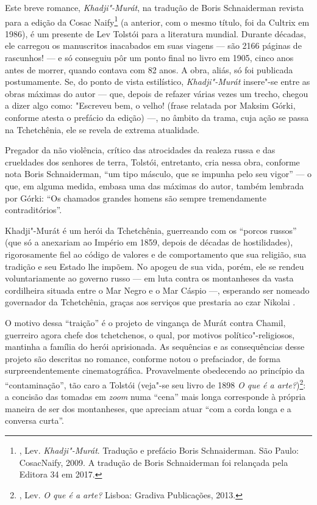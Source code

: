 Este breve romance, \emph{Khadji"-Murát}, na tradução de Boris
Schnaiderman revista para a edição da Cosac Naify\footnote{,
  Lev. \emph{Khadji"-Murát}. Tradução e prefácio Boris Schnaiderman. São
  Paulo: CosacNaify, 2009. A tradução de Boris Schnaiderman foi
  relançada pela Editora 34 em 2017.} (a anterior, com o mesmo título,
foi da Cultrix em 1986), é um presente de Lev Tolstói para a literatura
mundial. Durante décadas, ele carregou os manuscritos inacabados em suas
viagens --- são 2166 páginas de rascunhos! --- e só conseguiu pôr um
ponto final no livro em 1905, cinco anos antes de morrer, quando contava
com 82 anos. A obra, aliás, só foi publicada postumamente. Se, do ponto
de vista estilístico, \emph{Khadji"-Murát} insere"-se entre as
obras máximas do autor --- que, depois de refazer várias vezes um trecho,
chegou a dizer algo como: "Escreveu bem, o velho! (frase relatada por
Maksim Górki, conforme atesta o prefácio da edição) ---, no âmbito da
trama, cuja ação se passa na Tchetchênia, ele se revela de extrema
atualidade.

Pregador da não violência, crítico das atrocidades da realeza russa e
das crueldades dos senhores de terra, Tolstói, entretanto, cria nessa
obra, conforme nota Boris Schnaiderman, ``um tipo másculo, que se impunha
pelo seu vigor'' --- o que, em alguma medida, embasa uma das máximas do
autor, também lembrada por Górki: ``Os chamados grandes homens são sempre
tremendamente contraditórios''.

Khadji"-Murát é um herói da Tchetchênia, guerreando com os ``porcos
russos'' (que só a anexariam ao Império em 1859, depois de décadas de
hostilidades), rigorosamente fiel ao código de valores e de
comportamento que sua religião, sua tradição e seu Estado lhe impõem. No
apogeu de sua vida, porém, ele se rendeu voluntariamente ao governo
russo --- em luta contra os montanheses da vasta cordilheira situada
entre o Mar Negro e o Mar Cáspio ---, esperando ser nomeado governador da
Tchetchênia, graças aos serviços que prestaria ao czar Nikolai .

O motivo dessa ``traição'' é o projeto de vingança de Murát contra Chamil,
guerreiro agora chefe dos tchetchenos, o qual, por motivos
político"-religiosos, mantinha a família do herói aprisionada. As
sequências e as consequências desse projeto são descritas no romance,
conforme notou o prefaciador, de forma surpreendentemente
cinematográfica. Provavelmente obedecendo ao princípio da
``contaminação'', tão caro a Tolstói (veja"-se seu livro de 1898 \emph{O
que é a arte?})\footnote{, Lev. \emph{O que é a arte?} Lisboa:
  Gradiva Publicações, 2013.}: a concisão das tomadas em \emph{zoom}
numa ``cena'' mais longa corresponde à própria maneira de ser dos
montanheses, que apreciam atuar ``com a corda longa e a conversa curta''.

